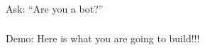 \begin{frame}[fragile]\frametitle{}
\begin{center}
{\Large Ask: ``Are you a bot?''}
\end{center}
\end{frame}


\begin{frame}[fragile]\frametitle{}
\begin{center}
{\Large Demo: Here is what you are going to build!!!}

\end{center}
\end{frame}